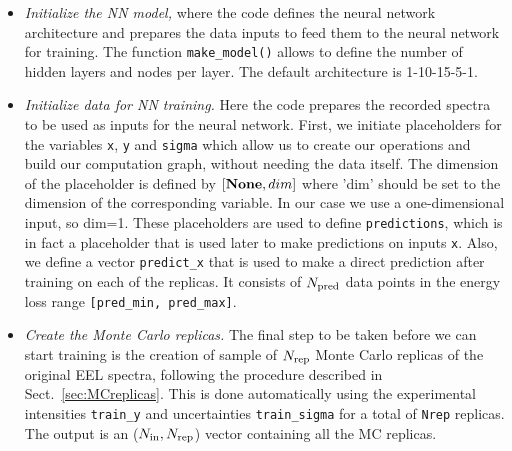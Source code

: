 \begin{itemize}
\item {\it Initialize the NN model,} where the code
  defines the neural network architecture and prepares the
data inputs to feed them to the neural network for training. 
%
The function {\tt make\_model()} allows to define the number of hidden layers and 
nodes per layer. The default  architecture is 1-10-15-5-1.

\item {\it Initialize data for NN training.}
  Here the code prepares the recorded spectra to be used
as inputs for the neural network. 
%
First, we initiate placeholders for the variables
{\tt x}, {\tt y} and {\tt sigma} which
allow us to create our operations and 
build our computation graph, without needing the data itself. 
%
The dimension of the placeholder is defined by {\tt $[{\bf None}, dim]$} where 'dim'
should be set to the dimension of the corresponding variable. In our case we use a 
one-dimensional input, so dim=1. 
%
These placeholders are used to define {\tt predictions}, which is in fact a placeholder that is used 
later to make predictions on inputs {\tt x}. 
%
Also, we define a vector {\tt predict\_x} that is used to make a direct prediction after training
on each of the replicas. It consists of $N_{\rm pred}$ data points in the energy loss range
{\tt [pred\_min, pred\_max]}. 

\item {\it Create the Monte Carlo replicas.}
  The final step to be taken before we can start training is the creation of
  sample of $N_{\rm rep}$ Monte Carlo replicas of the original EEL spectra,
  following the procedure described in Sect.~\ref{sec:MCreplicas}.
%
This is done automatically using the experimental intensities {\tt train\_y} and uncertainties
{\tt train\_sigma} for a total of {\tt Nrep} replicas. The output is an ($N_{\rm in}, N_{\rm rep}$) 
vector containing all the MC replicas. 


\end{itemize}
